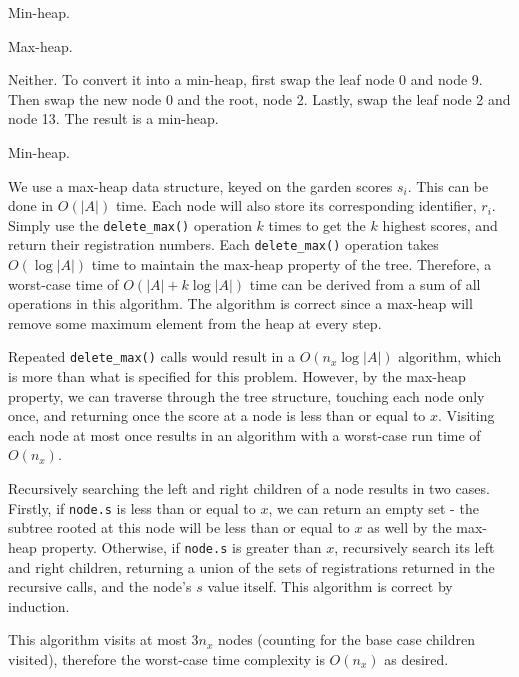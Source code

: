 \documentclass[12pt,twoside]{article}
\begin{document}
\begin{problems}
\newpage
\problem  %

\begin{problemparts}
\problempart %
Min-heap.

\problempart %
Max-heap.

\problempart %
Neither. To convert it into a min-heap, first swap the leaf node 0 and node 9. Then swap the new node 0 and the root, node 2. Lastly, swap the leaf node 2 and node 13. The result is a min-heap.

\problempart %
Min-heap.

\end{problemparts}

\newpage
\problem  %

\begin{problemparts}
\problempart %
We use a max-heap data structure, keyed on the garden scores $s_i$. This can be done in $O(|A|)$ time. Each node will also store its corresponding identifier, $r_i$. Simply use the \verb|delete_max()| operation $k$ times to get the $k$ highest scores, and return their registration numbers. Each \verb|delete_max()| operation takes $O(\log |A|)$ time to maintain the max-heap property of the tree. Therefore, a worst-case time of $O(|A| + k \log |A|)$ time can be derived from a sum of all operations in this algorithm. The algorithm is correct since a max-heap will remove some maximum element from the heap at every step.

\problempart %
Repeated \verb|delete_max()| calls would result in a $O(n_x \log |A|)$ algorithm, which is more than what is specified for this problem. However, by the max-heap property, we can traverse through the tree structure, touching each node only once, and returning once the score at a node is less than or equal to $x$. Visiting each node at most once results in an algorithm with a worst-case run time of $O(n_x)$.

Recursively searching the left and right children of a node results in two cases. Firstly, if \verb|node.s| is less than or equal to $x$, we can return an empty set - the subtree rooted at this node will be less than or equal to $x$ as well by the max-heap property. Otherwise, if \verb|node.s| is greater than $x$, recursively search its left and right children, returning a union of the sets of registrations returned in the recursive calls, and the node's $s$ value itself. This algorithm is correct by induction.

This algorithm visits at most $3n_x$ nodes (counting for the base case children visited), therefore the worst-case time complexity is $O(n_x)$ as desired.


\end{problemparts}
\end{problems}
\end{document}
